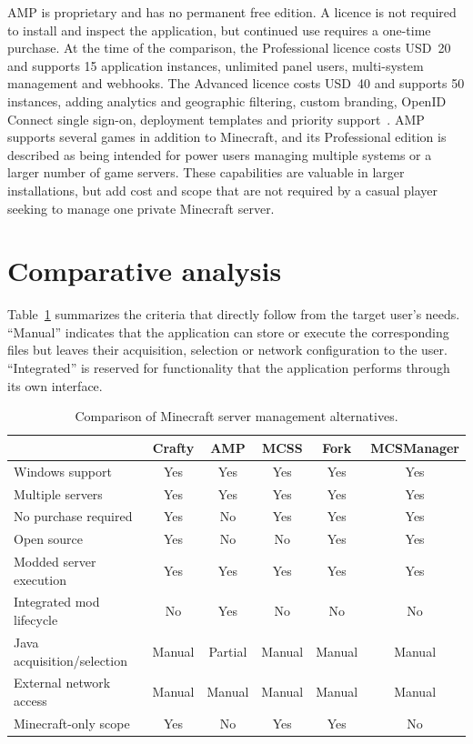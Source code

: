 AMP is proprietary and has no permanent free edition. A licence is not required to install and inspect the application, but continued use requires a one-time purchase. At the time of the comparison, the Professional licence costs USD~20 and supports 15 application instances, unlimited panel users, multi-system management and webhooks. The Advanced licence costs USD~40 and supports 50 instances, adding analytics and geographic filtering, custom branding, OpenID Connect single sign-on, deployment templates and priority support~\cite{AMPPricing}. AMP supports several games in addition to Minecraft, and its Professional edition is described as being intended for power users managing multiple systems or a larger number of game servers. These capabilities are valuable in larger installations, but add cost and scope that are not required by a casual player seeking to manage one private Minecraft server.

\section{Comparative analysis}

Table~\ref{tab:alternatives} summarizes the criteria that directly follow from the target user's needs. ``Manual'' indicates that the application can store or execute the corresponding files but leaves their acquisition, selection or network configuration to the user. ``Integrated'' is reserved for functionality that the application performs through its own interface.

\begin{table}[htbp]
\centering
\caption{Comparison of Minecraft server management alternatives.}
\label{tab:alternatives}
\small
\begin{tabularx}{\textwidth}{Xccccc}
\toprule
 & Crafty & AMP & MCSS & Fork & MCSManager \\
\midrule
Windows support & Yes & Yes & Yes & Yes & Yes \\
Multiple servers & Yes & Yes & Yes & Yes & Yes \\
No purchase required & Yes & No & Yes & Yes & Yes \\
Open source & Yes & No & No & Yes & Yes \\
Modded server execution & Yes & Yes & Yes & Yes & Yes \\
Integrated mod lifecycle & No & Yes & No & No & No \\
Java acquisition/selection & Manual & Partial & Manual & Manual & Manual \\
External network access & Manual & Manual & Manual & Manual & Manual \\
Minecraft-only scope & Yes & No & Yes & Yes & No \\
\bottomrule
\end{tabularx}
\end{table}


